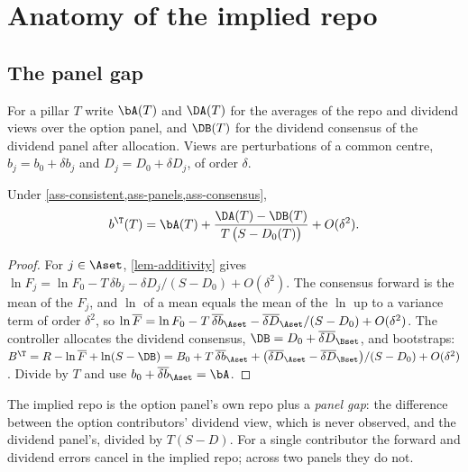 \section{Anatomy of the implied repo}\label{sec-anatomy}

\subsection{The panel gap}
For a pillar $T$ write $\bA(T)$ and $\DA(T)$ for the averages of the repo and dividend views over the option panel,
and $\DB(T)$ for the dividend consensus of the dividend panel after allocation. Views are perturbations of a common
centre, $b_j=b_0+\delta b_j$ and $D_j=D_0+\delta D_j$, of order $\delta$.

\begin{proposition}\label{prop-gap}
Under \cref{ass-consistent,ass-panels,ass-consensus},
\begin{equation}\label{eq-gap}
b^\T(T)=\bA(T)+\frac{\DA(T)-\DB(T)}{T\,\bigl(S-D_0(T)\bigr)}+O(\delta^2).
\end{equation}
\end{proposition}
\begin{proof}
For $j\in\Aset$, \cref{lem-additivity} gives
$\ln F_j=\ln F_0-T\,\delta b_j-\delta D_j/(S-D_0)+O(\delta^2)$. The consensus forward is the mean of the $F_j$, and
$\ln$ of a mean equals the mean of the $\ln$ up to a variance term of order $\delta^2$, so
$\ln\overline{F}=\ln F_0-T\,\overline{\delta b}_{\Aset}-\overline{\delta D}_{\Aset}/(S-D_0)+O(\delta^2)$. The
controller allocates the dividend consensus, $\DB=D_0+\overline{\delta D}_{\Bset}$, and bootstraps:
$B^\T=R-\ln\overline{F}+\ln(S-\DB)
=B_0+T\,\overline{\delta b}_{\Aset}+\bigl(\overline{\delta D}_{\Aset}-\overline{\delta D}_{\Bset}\bigr)/(S-D_0)+O(\delta^2)$.
Divide by $T$ and use $b_0+\overline{\delta b}_{\Aset}=\bA$.
\end{proof}

The implied repo is the option panel's own repo plus a \emph{panel gap}: the difference between the option
contributors' dividend view, which is never observed, and the dividend panel's, divided by $T(S-D)$. For a single
contributor the forward and dividend errors cancel in the implied repo; across two panels they do not.

